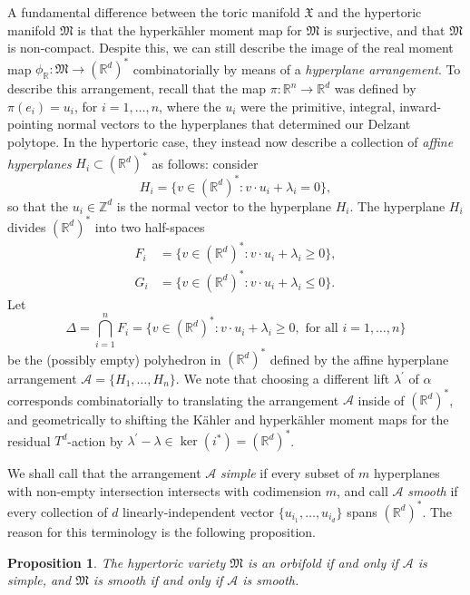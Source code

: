 \documentclass{article}
\newtheorem{prop}[theorem]{Proposition}
\newcommand{\st}{\ensuremath{:}}%
\newcommand{\K}{K\"ahler }
\newcommand{\HK}{hyperk\"ahler }
\newcommand{\RR}{\mathbb{R}}
\newcommand{\ZZ}{\mathbb{Z}}
\newcommand{\mc}[1]{\mathcal{#1}}
\newcommand{\mf}[1]{\mathfrak{#1}}
\newcommand{\prr}{\phi_{\mathbb{R}}}
\begin{document}
	A fundamental difference between the toric manifold $\mf{X}$ and the hypertoric manifold $\mf{M}$ is that the \HK moment map for $\mf{M}$ is surjective, and that $\mf{M}$ is non-compact. Despite this, we can still describe the image of the real moment map $\prr:\mf{M}\rightarrow (\RR^{d})^{\ast}$ combinatorially by means of a \emph{hyperplane arrangement}. To describe this arrangement, recall that the map $\pi:\RR^{n}\rightarrow \RR^{d}$ was defined by $\pi(e_{i}) = u_{i}$, for $i = 1,\ldots, n$, where the $u_{i}$ were the primitive, integral, inward-pointing normal vectors to the hyperplanes that determined our Delzant polytope. In the hypertoric case, they instead now describe a collection of \emph{affine hyperplanes} $H_{i} \subset (\RR^{d})^{\ast}$ as follows: consider
	$$
	H_{i} = \{ v \in (\RR^{d})^{\ast}\st v \cdot u_{i} + \lambda_{i} = 0 \},
	$$
	so that the $u_{i} \in \ZZ^{d}$ is the normal vector to the hyperplane $H_{i}$. The hyperplane $H_{i}$ divides $(\RR^{d})^{\ast}$ into two half-spaces
	\begin{equation*}
		\begin{split}
			F_{i} &= \{v \in (\RR^{d})^{\ast}\st v \cdot u_{i} + \lambda_{i} \geq 0\},\\
			G_{i} &= \{v \in (\RR^{d})^{\ast} \st v \cdot u_{i} + \lambda_{i} \leq 0  \}.
		\end{split}
	\end{equation*} 
	Let
	$$
	\Delta = \bigcap_{i=1}^{n}F_{i} = \{v \in (\RR^{d})^{\ast} \st v \cdot u_{i} + \lambda_{i} \geq 0, \text{ for all } i = 1,\ldots, n  \}
	$$
	be the (possibly empty) polyhedron in $(\RR^{d})^{\ast}$ defined by the affine hyperplane arrangement $\mc{A} = \{H_{1},\ldots, H_{n}  \}$. We note that choosing a different lift $\lambda^{\prime}$ of $\alpha$ corresponds combinatorially to translating the arrangement $\mc{A}$ inside of $(\RR^{d})^{\ast}$, and geometrically to shifting the \K and \HK moment maps for the residual $T^{d}$-action by $\lambda^{\prime} - \lambda \in \ker (i^{\ast}) = (\RR^{d})^{\ast}$.
	
	We shall call that the arrangement $\mc{A}$ \emph{simple} if every subset of $m$ hyperplanes with non-empty intersection intersects with codimension $m$, and call $\mc{A}$ \emph{smooth} if every collection of $d$ linearly-independent vector $\{u_{i_{1}},\ldots, u_{i_{d}}  \}$ spans $(\RR^{d})^{\ast}$. The reason for this terminology is the following proposition.
	
	\begin{prop}
		The hypertoric variety $\mf{M}$ is an orbifold if and only if $\mc{A}$ is simple, and $\mf{M}$ is smooth if and only if $\mc{A}$ is smooth.
	\end{prop}
	
\end{document}
